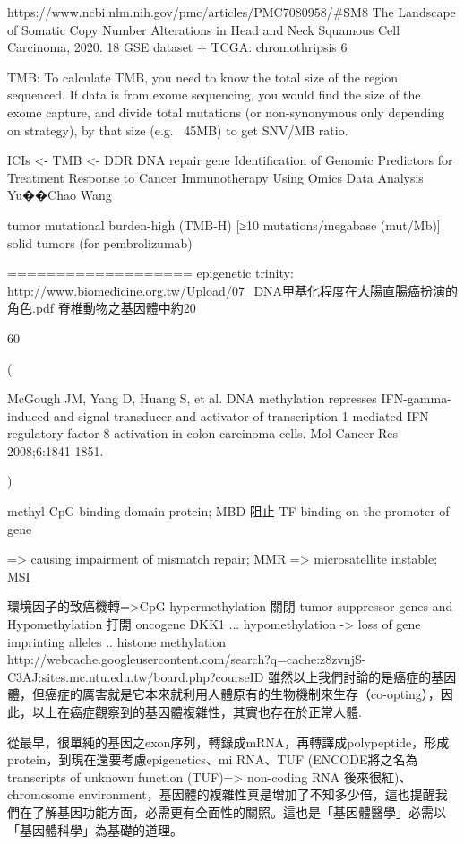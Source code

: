 \documentclass[preprint,12pt]{elsarticle}
\begin{document}
https://www.ncbi.nlm.nih.gov/pmc/articles/PMC7080958/#SM8 The Landscape of Somatic Copy Number Alterations in Head and Neck Squamous Cell Carcinoma, 2020.
18 GSE dataset + TCGA: chromothripsis 6%

TMB: To calculate TMB, you need to know the total size of the region sequenced. If data is from exome sequencing, you would find the size of the exome capture, and divide total mutations (or non-synonymous only depending on strategy), by that size (e.g. ~45MB) to get SNV/MB ratio.

ICIs <- TMB <- DDR DNA repair gene
Identification of Genomic Predictors for Treatment Response to Cancer Immunotherapy Using Omics Data Analysis
Yu��Chao Wang

tumor mutational burden-high (TMB-H) [≥10 mutations/megabase (mut/Mb)] solid tumors (for pembrolizumab)

===================
epigenetic trinity:
http://www.biomedicine.org.tw/Upload/07_DNA甲基化程度在大腸直腸癌扮演的角色.pdf
脊椎動物之基因體中約20%

60%

(




McGough JM, Yang D, Huang S, et al. DNA methylation represses IFN-gamma-induced and signal transducer and activator of transcription 1-mediated IFN regulatory factor 8 activation in colon carcinoma cells. Mol Cancer Res 2008;6:1841-1851.

)

methyl CpG-binding domain protein; MBD 阻止 TF binding on the promoter of gene

=> causing impairment of mismatch repair; MMR => microsatellite instable; MSI




環境因子的致癌機轉=>CpG hypermethylation
關閉 tumor suppressor genes
and
Hypomethylation 打開 oncogene
DKK1
...
hypomethylation ->
loss of gene imprinting
alleles 
..
histone methylation
http://webcache.googleusercontent.com/search?q=cache:z8zvnjS-C3AJ:sites.mc.ntu.edu.tw/board.php?courseID%
雖然以上我們討論的是癌症的基因體，但癌症的厲害就是它本來就利用人體原有的生物機制來生存（co-opting），因此，以上在癌症觀察到的基因體複雜性，其實也存在於正常人體.

從最早，很單純的基因之exon序列，轉錄成mRNA，再轉譯成polypeptide，形成protein，到現在還要考慮epigenetics、mi RNA、TUF (ENCODE將之名為transcripts of unknown function (TUF)=> non-coding RNA 後來很紅)、chromosome environment，基因體的複雜性真是增加了不知多少倍，這也提醒我們在了解基因功能方面，必需更有全面性的關照。這也是「基因體醫學」必需以「基因體科學」為基礎的道理。
\end{document}
